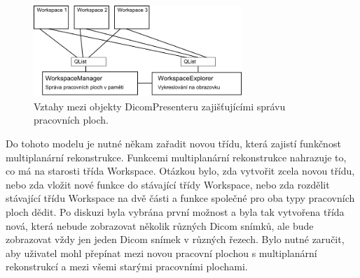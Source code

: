 \begin{figure}
	\caption{Vztahy mezi objekty DicomPresenteru zajišťujícími správu pracovních ploch.}
	\begin{center}
		\includegraphics[width=0.7\textwidth]{Text/IMG/WorkspaceManager.png}
	\end{center}
	\label{model}
\end{figure}

Do tohoto modelu je nutné někam zařadit novou třídu, která zajistí funkčnost multiplanární rekonstrukce. Funkcemi multiplanární rekonstrukce nahrazuje to, co má na starosti třída Workspace. Otázkou bylo, zda vytvořit zcela novou třídu, nebo zda vložit nové funkce do stávající třídy Workspace, nebo zda rozdělit stávající třídu Workspace na dvě části a funkce společné pro oba typy pracovních ploch dědit. Po diskuzi byla vybrána první možnost a byla tak vytvořena třída nová, která nebude zobrazovat několik různých Dicom snímků, ale bude zobrazovat vždy jen jeden Dicom snímek v různých řezech. Bylo nutné zaručit, aby uživatel mohl přepínat mezi novou pracovní plochou s multiplanární rekonstrukcí a mezi všemi starými pracovními plochami.

